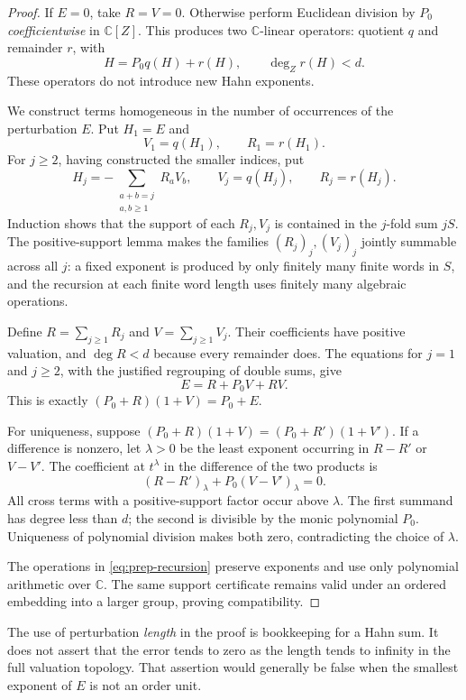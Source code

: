 \documentclass[11pt,letterpaper]{article}
\numberwithin{equation}{section}
\theoremstyle{definition}
\theoremstyle{remark}
\newcommand{\C}{\mathbb C}
\begin{document}
\begin{proof}
If $E=0$, take $R=V=0$. Otherwise perform Euclidean division by $P_0$
\emph{coefficientwise} in $\C[Z]$. This produces two $\C$-linear operators:
quotient $q$ and remainder $r$, with
\[
 H=P_0q(H)+r(H),\qquad \deg_Zr(H)<d.
\]
These operators do not introduce new Hahn exponents.

We construct terms homogeneous in the number of occurrences of the
perturbation $E$. Put $H_1=E$ and
\[
 V_1=q(H_1),\qquad R_1=r(H_1).
\]
For $j\ge2$, having constructed the smaller indices, put
\begin{equation}\label{eq:prep-recursion}
 H_j=-\sum_{\substack{a+b=j\\a,b\ge1}}R_aV_b,
 \qquad V_j=q(H_j),\qquad R_j=r(H_j).
\end{equation}
Induction shows that the support of each $R_j,V_j$ is contained in the
$j$-fold sum $jS$. The positive-support lemma makes the families
$(R_j)_j,(V_j)_j$ jointly summable across all $j$: a fixed exponent is produced
by only finitely many finite words in $S$, and the recursion at each finite
word length uses finitely many algebraic operations.

Define $R=\sum_{j\ge1}R_j$ and $V=\sum_{j\ge1}V_j$. Their coefficients have
positive valuation, and $\deg R<d$ because every remainder does.
The equations for $j=1$ and $j\ge2$, with the justified regrouping of double
sums, give
\[
 E=R+P_0V+RV.
\]
This is exactly $(P_0+R)(1+V)=P_0+E$.

For uniqueness, suppose $(P_0+R)(1+V)=(P_0+R')(1+V')$. If a difference is
nonzero, let $\lambda>0$ be the least exponent occurring in $R-R'$ or
$V-V'$. The coefficient at $t^\lambda$ in the difference of the two products
is
\[
 (R-R')_\lambda+P_0(V-V')_\lambda=0.
\]
All cross terms with a positive-support factor occur above $\lambda$.
The first summand has degree less than $d$; the second is divisible by the
monic polynomial $P_0$. Uniqueness of polynomial division makes both zero,
contradicting the choice of $\lambda$.

The operations in \eqref{eq:prep-recursion} preserve exponents and use only
polynomial arithmetic over $\C$. The same support certificate remains valid
under an ordered embedding into a larger group, proving compatibility.
\end{proof}

The use of perturbation \emph{length} in the proof is bookkeeping for a Hahn
sum. It does not assert that the error tends to zero as the length tends to
infinity in the full valuation topology. That assertion would generally be
false when the smallest exponent of $E$ is not an order unit.
\end{document}
